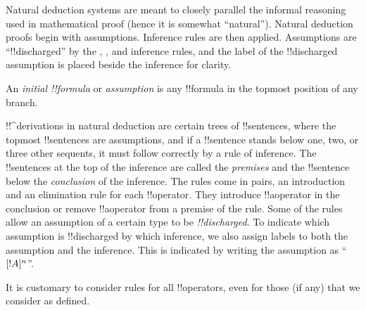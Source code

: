 \documentclass[../../../include/open-logic-section]{subfiles}
\begin{document}


\begin{explain}
Natural deduction systems are meant to closely parallel the informal
reasoning used in mathematical proof (hence it is somewhat
``natural''). Natural deduction proofs begin with assumptions.
Inference rules are then applied. Assumptions are ``!!{discharged}''
by the \Intro{\lnot}, \Intro{\lif}, \Elim{\lor} and \Elim{\lexists}
inference rules, and the label of the !!{discharged} assumption is
placed beside the inference for clarity.
\end{explain}

\begin{defn}
An \emph{initial !!{formula}} or \emph{assumption} is any !!{formula}
in the topmost position of any branch.
\end{defn}

!!^{derivation}s in natural deduction are certain trees of
!!{sentence}s, where the topmost !!{sentence}s are assumptions, and if
a !!{sentence} stands below one, two, or three other sequents, it must
follow correctly by a rule of inference. The !!{sentence}s at the top
of the inference are called the \emph{premises} and the !!{sentence}
below the \emph{conclusion} of the inference.  The rules come in
pairs, an introduction and an elimination rule for each
!!{operator}. They introduce !!a{operator} in the conclusion or
remove !!a{operator} from a premise of the rule.  Some of the rules
allow an assumption of a certain type to be \emph{!!{discharged}}. To
indicate which assumption is !!{discharged} by which inference, we
also assign labels to both the assumption and the inference.  This is
indicated by writing the assumption as ``$[!A]^{n}$''.

It is customary to consider rules for all !!{operator}s, even for
those (if any) that we consider as defined.
\end{document}
